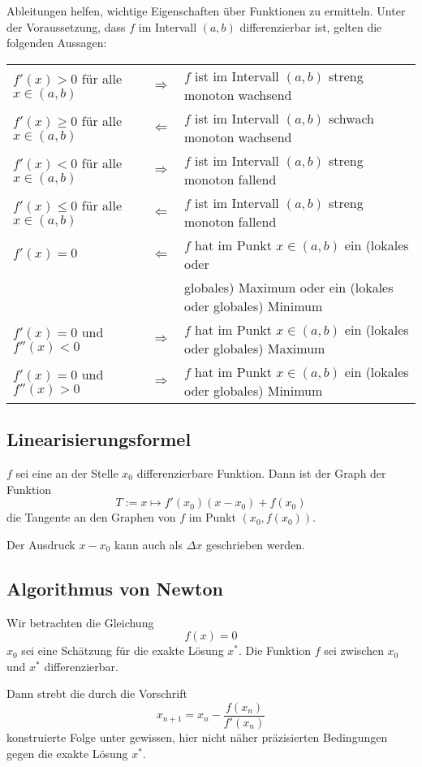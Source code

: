 \documentclass[10pt,a4paper]{article}
\begin{document}
Ableitungen helfen, wichtige Eigenschaften über Funktionen zu ermitteln. Unter der Voraussetzung, dass $f$ im Intervall $(a, b)$ differenzierbar ist, gelten die folgenden Aussagen:

\begin{tabular}{|lcl|}
\hline
$f'(x) > 0$ für alle $x \in (a,b)$ & $\Rightarrow$ & $f$ ist im Intervall $(a,b)$ streng monoton wachsend \\
$f'(x) \geq 0$ für alle $x \in (a,b)$ & $\Leftarrow$ & $f$ ist im Intervall $(a,b)$ schwach monoton wachsend \\
\hline
$f'(x) < 0$ für alle $x \in (a,b)$ & $\Rightarrow$ & $f$ ist im Intervall $(a,b)$ streng monoton fallend \\
$f'(x) \leq 0$ für alle $x \in (a,b)$ & $\Leftarrow$ & $f$ ist im Intervall $(a,b)$ streng monoton fallend \\
\hline
$f'(x) = 0$ & $\Leftarrow$ & $f$ hat im Punkt $x \in (a,b)$ ein (lokales oder\\&&globales) Maximum oder ein (lokales oder globales) Minimum \\
\hline
$f'(x) = 0$ und $f''(x) < 0$ & $\Rightarrow$ & $f$ hat im Punkt $x \in (a,b)$ ein (lokales oder globales) Maximum \\
$f'(x) = 0$ und $f''(x) > 0$ & $\Rightarrow$ & $f$ hat im Punkt $x \in (a,b)$ ein (lokales oder globales) Minimum \\
\hline
\end{tabular} 

\subsection{Linearisierungsformel}

$f$ sei eine an der Stelle $x_0$ differenzierbare Funktion. Dann ist der Graph der Funktion
$$T := x \mapsto f'(x_0)(x-x_0) + f(x_0)$$
die Tangente an den Graphen von $f$ im Punkt $(x_0, f(x_0))$.

Der Ausdruck $x - x_0$ kann auch als $\Delta x$ geschrieben werden.


\subsection{Algorithmus von Newton}

Wir betrachten die Gleichung
$$f(x) = 0$$
$x_0$ sei eine Schätzung für die exakte Lösung $x^*$. Die Funktion $f$ sei zwischen $x_0$ und $x^*$ differenzierbar.

Dann strebt die durch die Vorschrift
$$x_{n+1} = x_n - \frac{f(x_n)}{f'(x_n)}$$
konstruierte Folge unter gewissen, hier nicht näher präzisierten Bedingungen gegen die exakte Lösung $x^*$.
\end{document}
